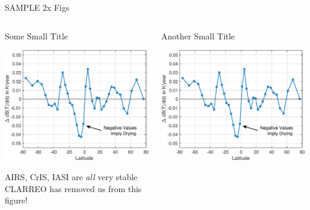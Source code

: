 \documentclass[10pt,t]{beamer}
\begin{document}
\begin{frame}[label={sec:org91507c7}]{SAMPLE 2x Figs}
\vspace{-0.3in}

\begin{columns}
\begin{column}{0.55\columnwidth}
\begin{block}{\footnotesize Some Small Title}
\vspace{-0.1in}
\begin{center}
\includegraphics[width=\linewidth]{./Figs/Pdf/drying_in_convective_regions_v2.pdf}
\end{center}

\footnotesize
AIRS, CrIS, IASI are \emph{all} very stable\\
CLARREO has removed us from this figure!
\end{block}
\end{column}

\begin{column}{0.55\columnwidth}
\begin{block}{\footnotesize Another Small Title}
\vspace{-0.1in}
\begin{center}
\includegraphics[width=\linewidth]{./Figs/Pdf/drying_in_convective_regions_v2.pdf}
\end{center}


\end{block}
\end{column}
\end{columns}
\end{frame}
\end{document}
